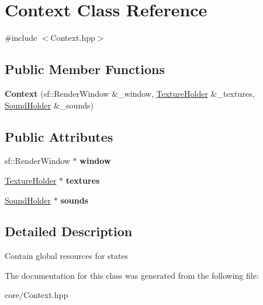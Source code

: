 \hypertarget{classContext}{\section{\-Context \-Class \-Reference}
\label{classContext}
}


{\ttfamily \#include $<$\-Context.\-hpp$>$}

\subsection*{\-Public \-Member \-Functions}
\begin{DoxyCompactItemize}
\item 
\hypertarget{classContext_a427f26b033dd1da604f4a63356d332a2_a427f26b033dd1da604f4a63356d332a2}{{\bfseries \-Context} (sf\-::\-Render\-Window \&\-\_\-window, \hyperlink{classTextureHolder}{\-Texture\-Holder} \&\-\_\-textures, \hyperlink{classSoundHolder}{\-Sound\-Holder} \&\-\_\-sounds)}\label{classContext_a427f26b033dd1da604f4a63356d332a2_a427f26b033dd1da604f4a63356d332a2}

\end{DoxyCompactItemize}
\subsection*{\-Public \-Attributes}
\begin{DoxyCompactItemize}
\item 
\hypertarget{classContext_adfd0cc74ffbdf3f22ae41f4114afb296_adfd0cc74ffbdf3f22ae41f4114afb296}{sf\-::\-Render\-Window $\ast$ {\bfseries window}}\label{classContext_adfd0cc74ffbdf3f22ae41f4114afb296_adfd0cc74ffbdf3f22ae41f4114afb296}

\item 
\hypertarget{classContext_a17045faaf6066a6430c6cf97151b29df_a17045faaf6066a6430c6cf97151b29df}{\hyperlink{classTextureHolder}{\-Texture\-Holder} $\ast$ {\bfseries textures}}\label{classContext_a17045faaf6066a6430c6cf97151b29df_a17045faaf6066a6430c6cf97151b29df}

\item 
\hypertarget{classContext_a864a15210fffe920e5bddf95fd135456_a864a15210fffe920e5bddf95fd135456}{\hyperlink{classSoundHolder}{\-Sound\-Holder} $\ast$ {\bfseries sounds}}\label{classContext_a864a15210fffe920e5bddf95fd135456_a864a15210fffe920e5bddf95fd135456}

\end{DoxyCompactItemize}


\subsection{\-Detailed \-Description}
\-Contain global resources for states 

\-The documentation for this class was generated from the following file\-:\begin{DoxyCompactItemize}
\item 
core/\-Context.\-hpp\end{DoxyCompactItemize}
